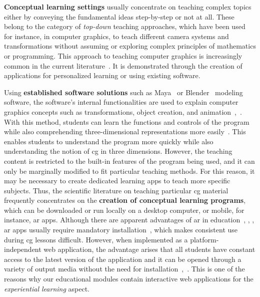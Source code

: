 \textbf{Conceptual learning settings} usually concentrate on teaching complex topics either by conveying the fundamental ideas step-by-step or not at all. These belong to the category of \emph{top-down} teaching approaches, which have been used for instance, in computer graphics, to teach different camera systems and transformations without assuming or exploring complex principles of mathematics or programming. This approach to teaching computer graphics is increasingly common in the current literature~\cite{Suselo:2019:problems-cg-teaching}. It is demonstrated through the creation of applications for personalized learning or using existing software.

Using \textbf{established software solutions} such as Maya~\cite{maya:2024:software} or Blender~\cite{blender:2024:documentation} modeling software, the software's internal functionalities are used to explain computer graphics concepts such as transformations, object creation, and animation~\cite{Elyan:2012:cg-tool},~\cite{Kadam:2013:cg-tool}. With this method, students can learn the functions and controls of the program while also comprehending three-dimensional representations more easily~\cite{Kadam:2013:cg-tool}. This enables students to understand the program more quickly while also understanding the notion of \acrshort{cg} in three dimensions. However, the teaching content is restricted to the built-in features of the program being used, and it can only be marginally modified to fit particular teaching methods. For this reason, it may be necessary to create dedicated learning apps to teach more specific subjects. Thus, the scientific literature on teaching particular \acrshort{cg} material frequently concentrates on the \textbf{creation of conceptual learning programs}, which can be downloaded or run locally on a desktop computer, or mobile, for instance, \acrfull{ar} apps.
Although there are apparent advantages of \acrshort{ar} in education~\cite{wu:2013:current}, \cite{lilligreen:2019:AWI}, \cite{lilligreen:2019:EuroVR}, \acrshort{ar} apps usually require mandatory installation~\cite{Qiao:2019:disadvantage-of-ar}, which makes consistent use during \acrshort{cg} lessons difficult. However, when implemented as a platform-independent web application, the advantage arises that all students have constant access to the latest version of the application and it can be opened through a variety of output media without the need for installation~\cite{Eisemann:2023:cg-tool},~\cite{angel:2017:interactive}.  This is one of the reasons why our educational modules contain interactive web applications for the \emph {experiential learning} aspect.



